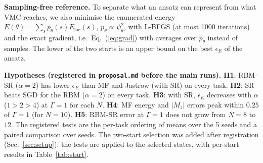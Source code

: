 \textbf{Sampling-free reference.} To separate what an ansatz can represent from what VMC reaches, we also minimise the enumerated energy $E(\theta)=\sum_sp_\theta(s)E_\mathrm{loc}(s)$, $p_\theta\propto\psi_\theta^2$, with L-BFGS (at most 1000 iterations) and the exact gradient, i.e.\ Eq.~(\ref{eq:grad}) with averages over $p_\theta$ instead of samples. The lower of the two starts is an upper bound on the best $\epsilon_E$ of the ansatz.

\textbf{Hypotheses (registered in \texttt{proposal.md} before the main runs).} \textbf{H1}: RBM-SR ($\alpha{=}2$) has lower $\epsilon_E$ than MF and Jastrow (with SR) on every task. \textbf{H2}: SR beats SGD for the RBM ($\alpha{=}2$) on every task. \textbf{H3}: with SR, $\epsilon_E$ decreases with $\alpha$ ($1>2>4$) at $\Gamma{=}1$ for each $N$. \textbf{H4}: MF energy and $|M_z|$ errors peak within $0.25$ of $\Gamma{=}1$ (for $N{=}10$). \textbf{H5}: RBM-SR error at $\Gamma{=}1$ does not grow from $N{=}8$ to $12$. The registered tests are the per-task ordering of means over the 5 seeds and a paired comparison over seeds. The two-start selection was added after registration (Sec.~\ref{sec:setup}); the tests are applied to the selected states, with per-start results in Table~\ref{tab:start}.
